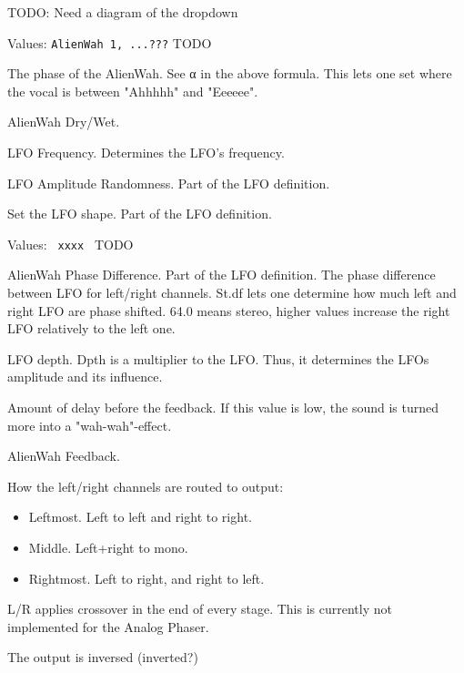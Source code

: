   TODO:  Need a diagram of the dropdown

   Values: \texttt{AlienWah 1, ...???} TODO

   The phase of the AlienWah.
   See α in the above formula. This lets one set where the vocal is between
   "Ahhhhh" and "Eeeeee".

   AlienWah Dry/Wet.

   LFO Frequency.
   Determines the LFO’s frequency.

   LFO Amplitude Randomness.
   Part of the LFO definition.

   Set the LFO shape.
   Part of the LFO definition.

   Values: \texttt{ xxxx } TODO

   AlienWah Phase Difference.
   Part of the LFO definition.
   The phase difference between LFO for left/right channels.
   St.df lets one determine how much left and right LFO are phase shifted.
   64.0 means stereo, higher values increase the right LFO relatively to the
   left one.

   LFO depth.  Dpth is a multiplier to the LFO. Thus, it determines
   the LFOs amplitude and its influence.

   Amount of delay before the feedback.
   If this value is low, the sound is turned more into a "wah-wah"-effect.

   AlienWah Feedback.

   How the left/right channels are routed to output:

   \begin{itemize}
      \item Leftmost. Left to left and right to right.
      \item Middle. Left+right to mono.
      \item Rightmost. Left to right, and right to left.
   \end{itemize}

   L/R applies crossover in the end of every stage. This is currently not
   implemented for the Analog Phaser.

   The output is inversed (inverted?)

